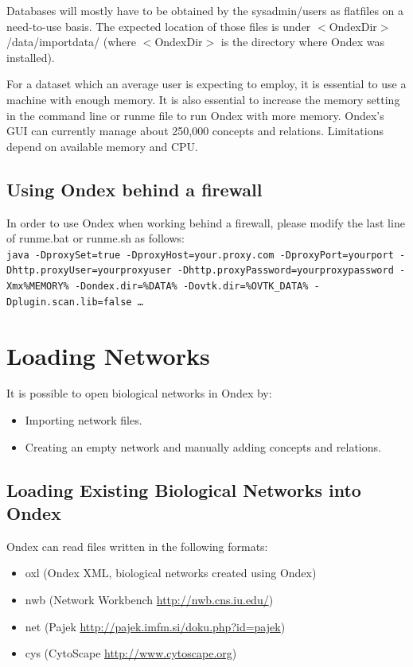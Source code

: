 Databases will mostly have to be obtained by the sysadmin/users as flatfiles on a need-to-use basis. 
The expected location of those files is under $<$OndexDir$>$/data/importdata/ 
(where $<$OndexDir$>$ is the directory where Ondex was installed).

For a dataset which an average user is expecting to employ, it is essential to use a machine with enough memory.
It is also essential to increase the memory setting in the command line or runme file to run Ondex with more memory. 
Ondex's GUI can currently manage about 250,000 concepts and relations.
Limitations depend on available memory and CPU.

\subsection{Using Ondex behind a firewall}
In order to use Ondex when working behind a firewall, please modify the last line of runme.bat or runme.sh as follows:\\
\texttt{java -DproxySet=true -DproxyHost=your.proxy.com -DproxyPort=yourport -Dhttp.proxyUser=yourproxyuser -Dhttp.proxyPassword=yourproxypassword
-Xmx\%MEMORY\% -Dondex.dir=\%DATA\% -Dovtk.dir=\%OVTK\_DATA\% -Dplugin.scan.lib=false \ldots}

\section{Loading Networks}
\label{sec:ref_loading}
It is possible to open biological networks in Ondex by:
\begin{itemize}
\item Importing network files.
\item Creating an empty network and manually adding concepts and relations.
\end{itemize}

\subsection{Loading Existing Biological Networks into Ondex}
Ondex can read files written in the following formats:
\begin{itemize}
\item oxl (Ondex XML, biological networks created using Ondex)
\item nwb (Network Workbench \url{http://nwb.cns.iu.edu/})
\item net (Pajek \url{http://pajek.imfm.si/doku.php?id=pajek})
\item cys (CytoScape \url{http://www.cytoscape.org})
\end{itemize}


